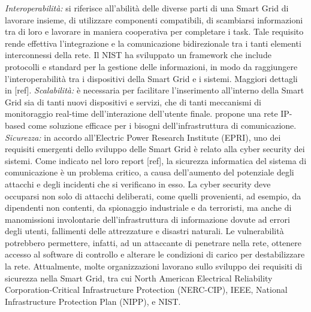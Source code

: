 \newline \newline
\textit{Interoperabilità:} si riferisce all'abilità delle diverse parti di una Smart Grid di lavorare insieme, di utilizzare componenti compatibili, di scambiarsi informazioni tra di loro e lavorare in maniera cooperativa per completare i task. Tale requisito rende effettiva l'integrazione e la comunicazione bidirezionale tra i tanti elementi interconnessi della rete.\newline
Il NIST ha sviluppato un framework che include protocolli e standard per la gestione delle informazioni, in modo da raggiungere l'interoperabilità tra i dispositivi della Smart Grid e i sistemi. Maggiori dettagli in [ref].
\newline \newline
\textit{Scalabilità:} è necessaria per facilitare l'inserimento all'interno della Smart Grid sia di tanti nuovi dispositivi e servizi, che di tanti meccanismi di monitoraggio real-time dell'interazione dell'utente finale. \newline
[ref] propone una rete IP-based come soluzione efficace per i bisogni dell'infrastruttura di comunicazione.
\newline \newline
\textit{Sicurezza:} in accordo all'Electric Power Research Institute (EPRI), uno dei requisiti emergenti dello sviluppo delle Smart Grid è relato alla cyber security dei sistemi. Come indicato nel loro report [ref], la sicurezza informatica del sistema di comunicazione è un problema critico, a causa dell'aumento del potenziale degli attacchi e degli incidenti che si verificano in esso. \newline 
La cyber security deve occuparsi non solo di attacchi deliberati, come quelli provenienti, ad esempio, da dipendenti non contenti, da spionaggio industriale e da terroristi, ma anche di manomissioni involontarie dell'infrastruttura di informazione dovute ad errori degli utenti, fallimenti delle attrezzature e disastri naturali. Le vulnerabilità potrebbero permettere, infatti, ad un attaccante di penetrare nella rete, ottenere accesso al software di controllo e alterare le condizioni di carico per destabilizzare la rete. \newline
Attualmente, molte organizzazioni lavorano sullo sviluppo dei requisiti di sicurezza nella Smart Grid, tra cui North American Electrical Reliability Corporation-Critical Infrastructure Protection (NERC-CIP), IEEE, National Infrastructure Protection Plan (NIPP), e NIST. \newline 
